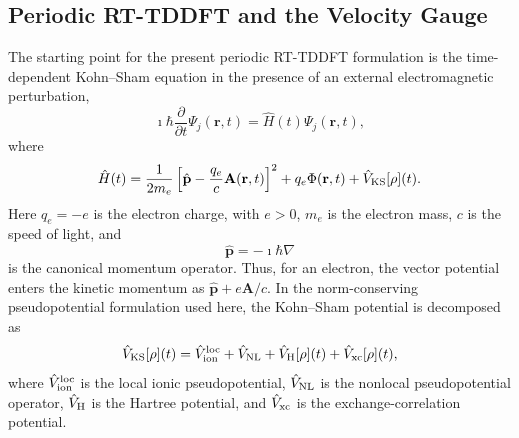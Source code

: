 \subsection{Periodic RT-TDDFT and the Velocity Gauge}
\label{sec:periodic-velocity-gauge}

The starting point for the present periodic RT-TDDFT formulation is
the time-dependent Kohn--Sham equation in the presence of an external
electromagnetic perturbation,
\begin{equation}
  \imath\hbar \frac{\partial}{\partial t}\Psi_j(\mathbf r,t)
  =
  \hat H(t)\Psi_j(\mathbf r,t),
  \label{eq:tdks_em_general}
\end{equation}
where
\begin{equation}
  \hat H(t)
  =
  \frac{1}{2m_e}
  \left[
    \hat{\mathbf p}
    -
    \frac{q_e}{c}\mathbf A(\mathbf r,t)
  \right]^2
  + q_e\Phi(\mathbf r,t)
  + \hat V_{\rm KS}[\rho](t).
  \label{eq:tdks_minimal_coupling}
\end{equation}
Here $q_e=-e$ is the electron charge, with $e>0$, $m_e$ is the
electron mass, $c$ is the speed of light, and
\begin{equation}
  \hat{\mathbf p}=-\imath\hbar\nabla
  \label{eq:canonical_momentum}
\end{equation}
is the canonical momentum operator.  Thus, for an electron, the vector
potential enters the kinetic momentum as $\hat{\mathbf p}+e\mathbf A/c$.
In the norm-conserving pseudopotential formulation used here, the
Kohn--Sham potential is decomposed as
\begin{equation}
  \hat V_{\rm KS}[\rho](t)
  =
  \hat V_{\rm ion}^{\rm loc}
  + \hat V_{\rm NL}
  + \hat V_{\rm H}[\rho](t)
  + \hat V_{\rm xc}[\rho](t),
  \label{eq:vks_decomposition}
\end{equation}
where $\hat V_{\rm ion}^{\rm loc}$ is the local ionic pseudopotential,
$\hat V_{\rm NL}$ is the nonlocal pseudopotential operator,
$\hat V_{\rm H}$ is the Hartree potential, and $\hat V_{\rm xc}$ is the
exchange-correlation potential.

